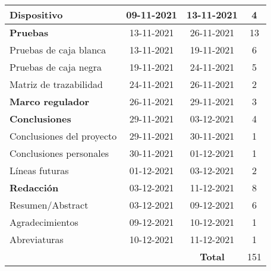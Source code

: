 \begin{longtable}[c]{lcc|c|}
	\multicolumn{1}{|l|}{Dispositivo}                        & \multicolumn{1}{c|}{09-11-2021} & 13-11-2021     & 4   \\ \hline
	\multicolumn{1}{|l|}{\textbf{Pruebas}}                   & \multicolumn{1}{c|}{13-11-2021} & 26-11-2021     & 13  \\ \hline
	\multicolumn{1}{|l|}{Pruebas de caja blanca}             & \multicolumn{1}{c|}{13-11-2021} & 19-11-2021     & 6   \\ \hline
	\multicolumn{1}{|l|}{Pruebas de caja negra}              & \multicolumn{1}{c|}{19-11-2021} & 24-11-2021     & 5   \\ \hline
	\multicolumn{1}{|l|}{Matriz de trazabilidad}             & \multicolumn{1}{c|}{24-11-2021} & 26-11-2021     & 2   \\ \hline
	\multicolumn{1}{|l|}{\textbf{Marco regulador}}           & \multicolumn{1}{c|}{26-11-2021} & 29-11-2021     & 3   \\ \hline
	\multicolumn{1}{|l|}{\textbf{Conclusiones}}              & \multicolumn{1}{c|}{29-11-2021} & 03-12-2021     & 4   \\ \hline
	\multicolumn{1}{|l|}{Conclusiones del proyecto}          & \multicolumn{1}{c|}{29-11-2021} & 30-11-2021     & 1   \\ \hline
	\multicolumn{1}{|l|}{Conclusiones personales}            & \multicolumn{1}{c|}{30-11-2021} & 01-12-2021     & 1   \\ \hline
	\multicolumn{1}{|l|}{Líneas futuras}                     & \multicolumn{1}{c|}{01-12-2021} & 03-12-2021     & 2   \\ \hline
	\multicolumn{1}{|l|}{\textbf{Redacción}}                 & \multicolumn{1}{c|}{03-12-2021} & 11-12-2021     & 8   \\ \hline
	\multicolumn{1}{|l|}{Resumen/Abstract}                   & \multicolumn{1}{c|}{03-12-2021} & 09-12-2021     & 6   \\ \hline
	\multicolumn{1}{|l|}{Agradecimientos}                    & \multicolumn{1}{c|}{09-12-2021} & 10-12-2021     & 1   \\ \hline
	\multicolumn{1}{|l|}{Abreviaturas}                       & \multicolumn{1}{c|}{10-12-2021} & 11-12-2021     & 1   \\ \hline
	                                                         &                                 & \textbf{Total} & 151 \\ \cline{4-4}
\end{longtable}
\pagebreak
